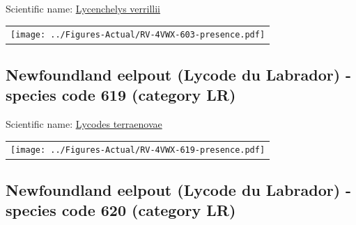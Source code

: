 \documentclass[12pt]{article}\usepackage[]{graphicx}\usepackage[]{color}
\begin{document}
  


Scientific name: \href{http://www.marinespecies.org/aphia.php?p=taxdetails\&id=159258}{Lycenchelys verrillii} \newline
\begin{minipage}{1.0\textwidth}
 \begin{tabular}{c}
\texttt{[image: ../Figures-Actual/RV-4VWX-603-presence.pdf]} \\ 
\end{tabular} 
\end{minipage}
\clearpage

\renewcommand\thefigure{\thesubsection\Alph{figure}}

\setcounter{figure}{0}

\hypertarget{sec:619}{%
\subsection{Newfoundland eelpout (Lycode du Labrador) - species code 619 (category LR)}\label{sec:619}}

  


Scientific name: \href{http://www.marinespecies.org/aphia.php?p=taxdetails\&id=127117}{Lycodes terraenovae} \newline
\begin{minipage}{1.0\textwidth}
 \begin{tabular}{c}
\texttt{[image: ../Figures-Actual/RV-4VWX-619-presence.pdf]} \\ 
\end{tabular} 
\end{minipage}
\clearpage

\renewcommand\thefigure{\thesubsection\Alph{figure}}

\setcounter{figure}{0}

\hypertarget{sec:620}{%
\subsection{Newfoundland eelpout (Lycode du Labrador) - species code 620 (category LR)}\label{sec:620}}
\end{document}

